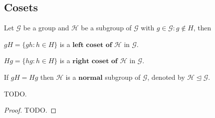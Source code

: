 \subsection{Cosets} %
\label{subsec:cosets}



Let $\mathcal{G}$ be a group and $\mathcal{H}$ be a subgroup of $\mathcal{G}$ with $g \in \mathcal{G} : g \notin H$, then
\begin{defn}
	$gH = \{gh : h \in H\}$ is a $\textbf{left coset of } \mathcal{H}$ in $\mathcal{G}$.
\end{defn}

\begin{defn}
	$Hg = \{hg : h \in H\}$ is a $\textbf{right coset of } \mathcal{H}$ in $\mathcal{G}$.
\end{defn}

\begin{defn}
	If $gH = Hg$ then $\mathcal{H}$ is a $\textbf{normal}$ subgroup of $\mathcal{G}$, denoted by $\mathcal{H} \unlhd \mathcal{G}$.
\end{defn}

\begin{thm}
	TODO.
\end{thm}

\begin{proof}
	TODO.
\end{proof}
